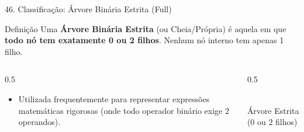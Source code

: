 \documentclass[9pt]{beamer}
\begin{document}
    \begin{frame}{46. Classificação: Árvore Binária Estrita (Full)}
        \begin{block}{Definição}
            Uma \textbf{Árvore Binária Estrita} (ou Cheia/Própria) é aquela em que \textbf{todo nó tem exatamente 0 ou 2 filhos}. Nenhum nó interno tem apenas 1 filho.
        \end{block}
        \vspace{0.3cm}
        \begin{columns}
            \begin{column}{0.5\textwidth}
                \begin{itemize}
                    \item Utilizada frequentemente para representar expressões matemáticas rigorosas (onde todo operador binário exige 2 operandos).
                \end{itemize}
            \end{column}
            \begin{column}{0.5\textwidth}
                \centering
                \\
                \vspace{0.2cm}
                \tiny Árvore Estrita (0 ou 2 filhos)
            \end{column}
        \end{columns}
    \end{frame}
\end{document}
